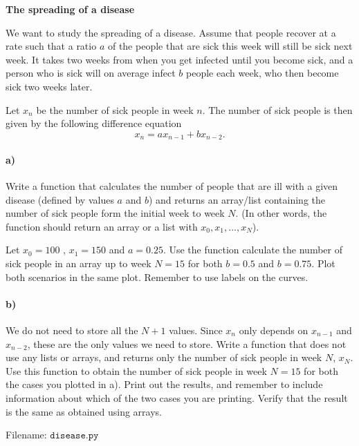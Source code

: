 \begin{Problem}{\textbf{The spreading of a disease}}

\noindent We want to study the spreading of a disease. Assume that people recover at a rate such that a ratio $a$ of the people
that are sick this week will still be sick next week. It takes two weeks from when you
get infected until you become sick, and a person who is sick will on average infect
$b$ people each week, who then become sick two weeks later.

Let $x_n$ be the
number of sick people in week $n$. The number of sick people is then given by the following difference equation
\begin{equation*}
x_n = a x_{n-1} + b x_{n-2} .
\end{equation*}

\paragraph{a)}
Write a function  that calculates the number of people that are ill with a given disease (defined by values $a$ and $b$) and returns an array/list containing the number of sick people form the initial week to week $N$. (In other words, the function should return an array or a list with $x_0, x_1, ..., x_N$).

Let  $x_0 = 100$ , $x_1 = 150$ and $a = 0.25$. Use the function calculate the number of sick
people in an array up to week $N = 15$ for both $b = 0.5$ and $b = 0.75$. Plot both scenarios in the same plot. Remember to use labels on the curves.


\paragraph{b)}
We do not need to store all the $N + 1$ values. Since $x_n$ only depends on
$x_{n-1}$ and $x_{n-2}$, these are the only values we need to store. Write a function  that does not use any lists or arrays, and returns only the number of sick people in week $N$, $x_N$. Use this function to obtain the number of sick people in week $N = 15$ for both the cases you plotted in a). Print out the results, and remember to include information about which of the two cases you are printing. Verify that the result is the same as obtained using arrays.

Filename: $\texttt{disease.py}$
\end{Problem}

